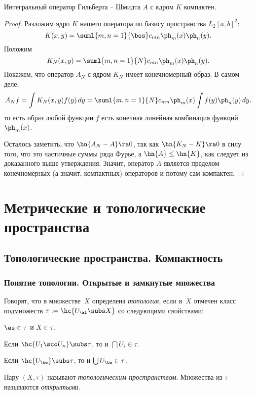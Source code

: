 \documentclass[a4paper]{article}
\begin{document}
\begin{theorem}
Интегральный оператор Гильберта -- Шмидта $A$ с ядром $K$ компактен.
\end{theorem}
\begin{proof}
Разложим ядро $K$ нашего оператора по базису пространства $L_2[a,b]^2$:
$$K(x,y) = \suml{m,n=1}{\bes} c_{mn} \ph_m(x)\ph_n(y).$$
Положим
$$K_N(x,y) = \suml{m,n=1}{N} c_{mn} \ph_m(x)\ph_n(y).$$
Покажем, что оператор $A_N$ с ядром $K_N$ имеет конечномерный образ. В самом деле,
$$A_N f = \int K_N(x,y) f(y)\,dy = \suml{m,n=1}{N} c_{mn} \ph_m(x) \int f(y) \ph_n(y) \,dy.$$
то есть образ любой функции $f$ есть конечная линейная комбинация функций $\ph_m(x)$.

Осталось заметить, что $\hn{A_N - A} \ra 0$, так как $\hn{K_N - K} \ra 0$
в силу того, что это частичные суммы ряда Фурье, а $\hn{A} \le \hn{K}$, как следует
из доказанного выше утверждения. Значит, оператор $A$ является пределом конечномерных (а значит,
компактных) операторов и потому сам компактен.
\end{proof}

\section{Метрические и топологические пространства}

\subsection{Топологические пространства. Компактность}

\subsubsection{Понятие топологии. Открытые и замкнутые множества}

\begin{df}
Говорят, что в множестве~$X$ определена \emph{топология}, если в~$X$ отмечен класс подмножеств
$\tau := \hc{U_\al \subs X}$ со
следующими свойствами:
\begin{items}{-3}
\item $\es \in \tau$ и $X \in \tau$.
\item Если $\hc{U_1\sco U_n} \subs \tau$, то и $\bigcap U_i  \in \tau$.
\item Если $\hc{U_\be} \subs \tau$, то и $\bigcup U_\be  \in \tau$.
\end{items}
Пару $(X, \tau)$ называют \emph{топологическим пространством}. Множества из $\tau$ называются \emph{открытыми}.
\end{df}
\end{document}
